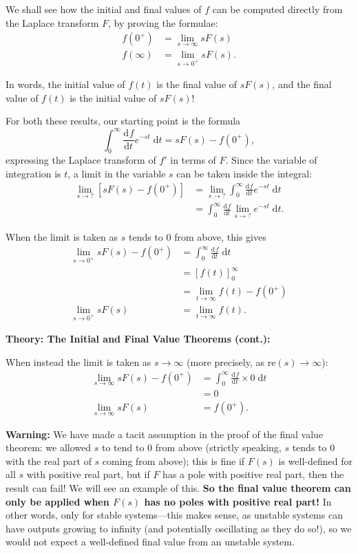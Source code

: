 \documentclass{article}
\newcommand{\deriv}[3][]{\frac{\mathrm{d}^{#1}#2}{\mathrm{d}#3^{#1}}}
\newcommand{\diff}{\;\mathrm{d}}
\begin{document}
We shall see how the initial and final values of $f$ can be computed directly from the Laplace transform $F$, by proving the formulae:
\begin{align*}
	f(0^+) &= \lim_{s\to \infty}sF(s)\\
	f(\infty)&=\lim_{s\to 0^+} sF(s).
\end{align*}

In words, the initial value of $f(t)$ is the final value of $sF(s)$, and the final value of $f(t)$ is the initial value of $sF(s)$!\bigskip

For both these results, our starting point is the formula
\[\int_0^\infty \deriv{f}{t}e^{-st}\diff t = sF(s)-f(0^+),\]
expressing the Laplace transform of $f'$ in terms of $F$. Since the variable of integration is $t$, a limit in the variable $s$ can be taken inside the integral:
\begin{align*}
	\lim_{s\to ?} \left[sF(s)-f(0^+)\right]&=\lim_{s\to ?}\int_0^\infty \deriv{f}{t}e^{-st}\diff t\\
	&=\int_0^\infty \deriv{f}{t}\lim_{s\to ?}e^{-st}\diff t.
\end{align*}

When the limit is taken as $s$ tends to 0 from above, this gives
\begin{align*}
	\lim_{s\to 0^+} sF(s) - f(0^+)&=\int_0^\infty \deriv{f}{t}\diff t\\
	&= \left[f(t)\right]_0^\infty\\
	&=\lim_{t\to\infty} f(t) - f(0^+)\\
	\lim_{s\to 0^+}sF(s)&=\lim_{t\to \infty}f(t).
\end{align*}

\clearpage


\textbf{Theory: The Initial and Final Value Theorems (cont.):}\bigskip


When instead the limit is taken as $s\to \infty$ (more precisely, as $\mathrm{re}(s)\to \infty$):
\begin{align*}
	\lim_{s\to \infty} sF(s)-f(0^+)&=\int_0^\infty \deriv{f}{t}\times 0\diff t\\
	&=0\\
	\lim_{s\to \infty}sF(s)&=f(0^+).
\end{align*}\bigskip

\textbf{Warning:} We have made a tacit assumption in the proof of the final value theorem: we allowed $s$ to tend to 0 from above (strictly speaking, $s$ tends to $0$ with the real part of $s$ coming from above); this is fine if $F(s)$ is well-defined for all $s$ with positive real part, but if $F$ has a pole with positive real part, then the result can fail! We will see an example of this. \textbf{So the final value theorem can only be applied when $F(s)$ has no poles with positive real part!} In other words, only for stable systems---this makes sense, as unstable systems can have outputs growing to infinity (and potentially oscillating as they do so!), so we would not expect a well-defined final value from an unstable system.\bigskip
\end{document}
